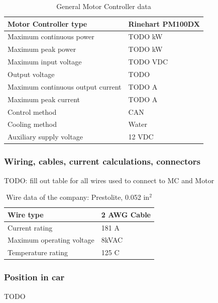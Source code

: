 \documentclass{article}
\begin{document}
\begin{table}[H]
	\centering
	\begin{tabular}{|l|l|}
	\hline
	Motor Controller type & Rinehart PM100DX \\ \hline
	Maximum continuous power & TODO kW \\ \hline
	Maximum peak power & TODO kW \\ \hline
	Maximum input voltage & TODO VDC \\ \hline
	Output voltage & TODO \\ \hline
	Maximum continuous output current & TODO A \\ \hline
	Maximum peak current & TODO A \\ \hline
	Control method & CAN \\ \hline
	Cooling method & Water \\ \hline
	Auxiliary supply voltage & 12 VDC \\ \hline
	\end{tabular}
	\caption{General Motor Controller data}
	\label{MC}
\end{table}

\subsubsection{Wiring, cables, current calculations, connectors}
TODO: fill out table for all wires used to connect to MC and Motor

\begin{table}[H]
	\centering
	\begin{tabular}{|l|l|}
	\hline
	Wire type & 2 AWG Cable\\ \hline
	Current rating & 181 A \\ \hline
	Maximum operating voltage & 8kVAC \\ \hline
	Temperature rating & 125 \degree C \\ \hline
	\end{tabular}
	\caption{Wire data of the company: Prestolite, 0.052 in$^{2}$}
	\label{motortomcwire}
\end{table}

\subsubsection{Position in car}
TODO
\end{document}
